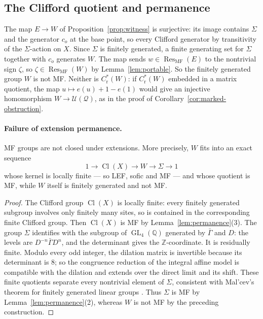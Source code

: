 \documentclass[11pt]{amsart}
\newcommand{\leanverified}[2]{\ignorespaces}
\theoremstyle{definition}
\theoremstyle{remark}
\theoremstyle{plain}
\newcommand{\GL}{\operatorname{GL}}
\newcommand{\U}{\mathcal U}
\newcommand{\Cl}{\operatorname{Cl}}
\newcommand{\Cred}{C^*_{\mathrm r}}
\begin{document}
\subsection{The Clifford quotient and permanence}

The map $E\to W$ of Proposition~\ref{prop:witness} is surjective: its image
contains $\Sigma$ and the generator $c_o$ at the base point, so
every Clifford generator by transitivity of
the $\Sigma$-action on $X$.  Since $\Sigma$ is finitely generated,
a finite generating set for $\Sigma$ together with $c_o$ generates $W$.
The map sends
$w\in\operatorname{Res}_{\mathrm{MF}}(E)$ to the nontrivial sign
$\zeta$, so $\zeta\in\operatorname{Res}_{\mathrm{MF}}(W)$ by
Lemma~\ref{lem:portable}.  So the finitely generated group $W$ is
not MF\@.  Neither is $\Cred(W)$: if $\Cred(W)$ embedded in a matrix
quotient, the map $u\mapsto e(u)+1-e(1)$ would give an injective
homomorphism $W\to\U(\mathcal Q)$, as in the proof of
Corollary~\ref{cor:marked-obstruction}.

\paragraph{Failure of extension permanence.}
MF groups are not closed under extensions.  More precisely, $W$ fits into
an exact sequence
\[
 1\longrightarrow\Cl(X)\longrightarrow W\longrightarrow\Sigma
 \longrightarrow1
\]
whose kernel is locally finite --- so LEF, sofic and MF --- and
whose quotient is MF, while $W$ itself is finitely generated and not
MF\@.
\leanverified{Sofic/LiteralWitnessConsequences}{GroupApproximation.LiteralWitnessConsequences.literalWitness_locallyFiniteKernel_nonMF}

\begin{proof}
The Clifford group $\Cl(X)$ is locally finite: every finitely
generated subgroup involves only finitely many sites, so is contained
in the corresponding finite Clifford group.  Then $\Cl(X)$ is MF
by Lemma~\ref{lem:permanence}(3).  The group $\Sigma$ identifies with
the subgroup of
$\GL_4(\mathbb Q)$ generated by $\bar\Gamma$ and $D$: the levels
are $D^{-n}\bar\Gamma D^{n}$, and the determinant gives the
$\mathbb Z$-coordinate.  It is residually finite.  Modulo every odd
integer, the dilation matrix is invertible because its determinant is
$8$; so the congruence reduction of the integral affine model is
compatible with the dilation and extends over the direct limit and
its shift.  These finite quotients separate every nontrivial element
of $\Sigma$, consistent with Mal'cev's theorem for finitely generated
linear groups \cite{Malcev}.  Thus $\Sigma$ is MF by Lemma~\ref{lem:permanence}(2),
whereas $W$ is not MF by the preceding construction.
\end{proof}
\end{document}
